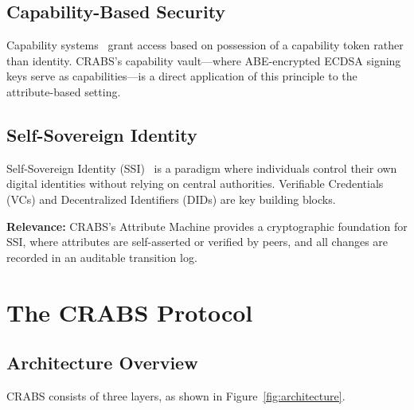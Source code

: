 \documentclass[sigconf,nonacm]{acmart}
\newcommand{\crab}{\textsc{CRABS}}
\begin{document}
\subsection{Capability-Based Security}

Capability systems~\cite{dennis1966capability} grant access based on possession of a capability token rather than identity. \crab{}'s capability vault---where ABE-encrypted ECDSA signing keys serve as capabilities---is a direct application of this principle to the attribute-based setting.

\subsection{Self-Sovereign Identity}

Self-Sovereign Identity (SSI)~\cite{allen2016ssi} is a paradigm where individuals control their own digital identities without relying on central authorities. Verifiable Credentials (VCs) and Decentralized Identifiers (DIDs) are key building blocks.

\textbf{Relevance:} \crab{}'s Attribute Machine provides a cryptographic foundation for SSI, where attributes are self-asserted or verified by peers, and all changes are recorded in an auditable transition log.

\section{The \crab{} Protocol}

\subsection{Architecture Overview}

\crab{} consists of three layers, as shown in Figure~\ref{fig:architecture}.
\end{document}
